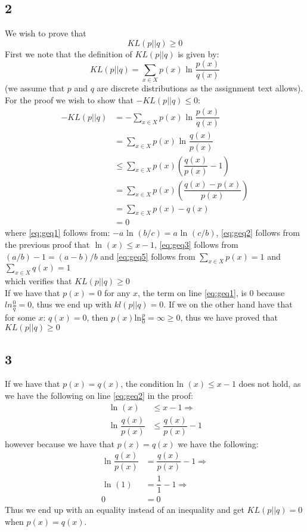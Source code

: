 \documentclass{article}
\begin{document}
\subsection{2}
We wish to prove that
\begin{equation}
KL(p||q) \geq 0
\end{equation}
First we note that the definition of $KL(p||q)$ is given by:
\begin{equation}
KL(p||q) = \sum\limits_{x \in X} p(x) \text{ ln } \dfrac{p(x)}{q(x)}
\end{equation}
(we assume that $p$ and $q$ are discrete distributions as the assignment text allows). For the proof we wish to show that $-KL(p||q) \leq 0$:
\begin{align}
- KL(p||q) &= - \sum\limits_{x \in X} p(x) \text{ ln } \dfrac{p(x)}{q(x)}\\
\label{eq:geq1}
&= \sum\limits_{x \in X} p(x) \text{ ln } \dfrac{q(x)}{p(x)}\\
\label{eq:geq2}
&\leq \sum\limits_{x \in X} p(x) \left( \dfrac{q(x)}{p(x)} -1 \right) \\
\label{eq:geq3}
&= \sum\limits_{x \in X} p(x) \left( \dfrac{q(x) - p(x)}{p(x)}\right) \\
\label{eq:geq4}
&= \sum\limits_{x \in X} p(x)- q(x) \\
\label{eq:geq5}
&= 0
\end{align}
where \eqref{eq:geq1} follows from: $- a \text{ ln } (b/c) = a \text{ ln } (c/b)$, \eqref{eq:geq2} follows from the previous proof that $\text{ ln }(x) \leq x-1$, \eqref{eq:geq3} follows from $(a/b)-1 = (a-b)/b$ and \eqref{eq:geq5} follows from $\sum\limits_{x \in X} p(x) = 1$ and $\sum\limits_{x \in X} q(x) = 1$
\\
which verifies that $KL(p||q) \geq 0$ \\
If we have that $p(x)=0$ for any $x$, the term on line \eqref{eq:geq1}, is 0 because $ln\frac{0}{q} = 0$, thus we end up with $kl(p||q)=0$. If we on the other hand have that for some $x$: $q(x)=0$, then $p(x) \text{ln} \frac{p}{0} = \infty \geq 0$,  thus we have proved that $KL(p||q) \geq 0$
\subsection{3}
If we have that $p(x) = q(x)$, the condition $\text{ln }(x) \leq x-1$ does not hold, as we have the following on line \eqref{eq:geq2} in the proof:
\begin{align}
\text{ ln } (x) &\leq x-1 \Rightarrow \\
\text{ ln }\dfrac{q(x)}{p(x)} &\leq  \dfrac{q(x)}{p(x)} - 1
\end{align}
however because we have that $p(x) = q(x)$ we have the following:
\begin{align}
\text{ ln }\dfrac{q(x)}{p(x)} &=  \dfrac{q(x)}{p(x)} - 1 \Rightarrow \\
\text{ ln } (1) &= \dfrac{1}{1} - 1 \Rightarrow \\
0 &= 0
\end{align}
Thus we end up with an equality instead of an inequality and get $KL(p||q) = 0$ when $p(x) = q(x)$.
\end{document}
